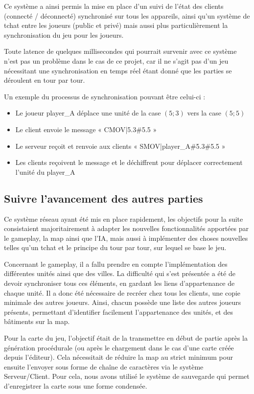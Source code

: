 \documentclass[12pt]{report}
\begin{document}
Ce système a ainsi permis la mise en place d’un suivi de l’état des clients
(connecté / déconnecté) synchronisé sur tous les appareils, ainsi qu’un système
de tchat entre les joueurs (public et privé) mais aussi plus particulièrement la
synchronisation du jeu pour les joueurs.

Toute latence de quelques millisecondes qui pourrait survenir avec ce système
n’est pas un problème dans le cas de ce projet, car il ne s’agit pas d’un jeu
nécessitant une synchronisation en temps réel étant donné que les parties se
déroulent en tour par tour.

Un exemple du processus de synchronisation pouvant être celui-ci :

\begin{itemize}
    \item Le joueur player\_A déplace une unité de la case $(5; 3)$ vers la case
        $(5; 5)$
    \item Le client envoie le message « CMOV|5.3\#5.5 »
    \item Le serveur reçoit et renvoie aux clients « SMOV|player\_A\#5.3\#5.5 »
    \item Les clients reçoivent le message et le déchiffrent pour déplacer
        correctement l’unité du player\_A
\end{itemize}

\subsection{Suivre l’avancement des autres parties}

Ce système réseau ayant été mis en place rapidement, les objectifs pour la suite
consistaient majoritairement à adapter les nouvelles fonctionnalités apportées
par le gameplay, la map ainsi que l’IA, mais aussi à implémenter des choses
nouvelles telles qu’un tchat et le principe du tour par tour, sur lequel se base
le jeu.

Concernant le gameplay, il a fallu prendre en compte l’implémentation des
différentes unités ainsi que des villes. La difficulté qui s’est présentée a été
de devoir synchroniser tous ces éléments, en gardant les liens d’appartenance de
chaque unité. Il a donc été nécessaire de recréer chez tous les clients, une
copie minimale des autres joueurs. Ainsi, chacun possède une liste des autres
joueurs présents, permettant d’identifier facilement l’appartenance des unités,
et des bâtiments sur la map.

Pour la carte du jeu, l’objectif était de la transmettre en début de partie
après la génération procédurale (ou après le chargement dans le cas d'une carte
créée depuis l'éditeur). Cela nécessitait de réduire la map au strict minimum
pour ensuite l’envoyer sous forme de chaîne de caractères via le système
Serveur/Client. Pour cela, nous avons utilisé le système de sauvegarde qui
permet d’enregistrer la carte sous une forme condensée. 
\end{document}
